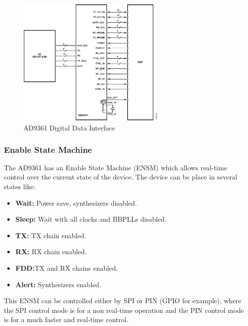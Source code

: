\begin{figure}[htbp]
    \centering
    \includegraphics[width=0.65\textwidth]{./figures/ad9361_digital_interface}
    \caption{ AD9361 Digital Data Interface
    \label{fig:ad9361diginterface}}
\end{figure}


\subsubsection{Enable State Machine}

The AD9361 has an Enable State Machine (ENSM) which allows real-time control over the current state of the device. The device can be place in several states like:

\begin{itemize}
		\item \textbf{Wait:} Power save, synthesizers disabled.
		\item \textbf{Sleep:} Wait with all clocks and BBPLLs disabled.
		\item \textbf{TX:} TX chain enabled.
		\item \textbf{RX:} RX chain enabled.
		\item \textbf{FDD:}TX and RX chains enabled.
		\item \textbf{Alert:} Synthesizers enabled.
	\end{itemize}
	This ENSM can be controlled either by SPI or PIN (GPIO for example), where the SPI control mode is for a non real-time operation and the PIN control mode is for a much faster and real-time control.


